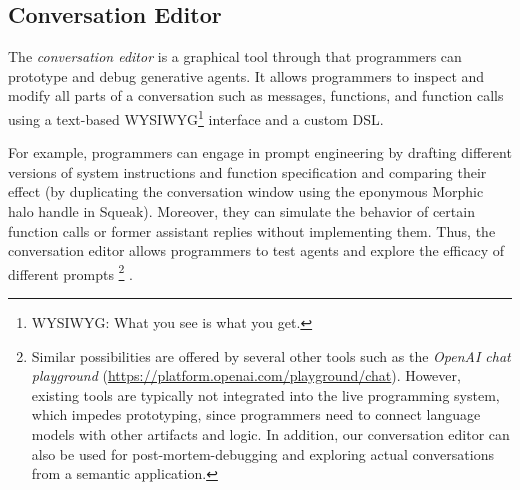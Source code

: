 \subsection*{Conversation Editor}
\label{sec:semtex/tools/editor}

The \emph{conversation editor} is a graphical tool through that programmers can prototype and debug generative agents.
It allows programmers to inspect and modify all parts of a conversation such as messages, functions, and function calls using a text-based WYSIWYG\footnote{WYSIWYG: What you see is what you get.} interface and a custom DSL.

\FloatBarrier

For example, programmers can engage in prompt engineering by drafting different versions of system instructions and function specification and comparing their effect (by duplicating the conversation window using the eponymous Morphic halo handle in Squeak).
Moreover, they can simulate the behavior of certain function calls or former assistant replies without implementing them.
Thus, the conversation editor allows programmers to test agents and explore the efficacy of different prompts%
\footnote{%
	Similar possibilities are offered by several other tools such as the \emph{OpenAI chat playground} (\url{https://platform.openai.com/playground/chat}).
	However, existing tools are typically not integrated into the live programming system, which impedes prototyping, since programmers need to connect language models with other artifacts and logic.
	In addition, our conversation editor can also be used for post-mortem-debugging and exploring actual conversations from a semantic application.
}%
.

